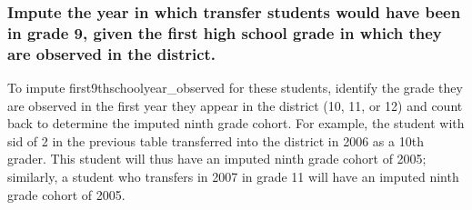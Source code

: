 \documentclass[12pt]{article}
\begin{document}
\subsubsection{Impute the year in which transfer students would have been in grade 9, given the first high school grade in which they are observed in the district.}

To impute first9thschoolyear\_observed for these students, identify the grade they are observed in the first year they appear in the district (10, 11, or 12) and count back to determine the imputed ninth grade cohort.  For example, the student with sid of 2 in the previous table transferred into the district in 2006 as a 10th grader.  This student  will thus have an imputed ninth grade cohort of 2005; similarly, a student who transfers in 2007 in grade 11 will have an imputed ninth grade cohort of 2005.
\end{document}
